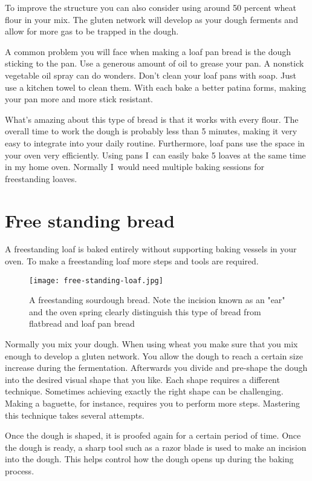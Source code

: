To improve the structure you can also consider using around 50 percent
wheat flour in your mix. The gluten network will develop as your
dough ferments and allow for more gas to be trapped in the dough.

A common problem you will face when making a loaf pan bread is
the dough sticking to the pan. Use a generous amount of oil to grease
your pan. A nonstick vegetable oil spray can do wonders.
Don't clean your loaf pans with soap. Just use a kitchen towel
to clean them. With each bake a better patina forms, making your
pan more and more stick resistant.

What's amazing about this type of bread is that it works
with every flour. The overall time to work the dough is probably
less than 5 minutes, making it very easy to integrate
into your daily routine. Furthermore, loaf pans use the space
in your oven very efficiently. Using pans I~can
easily bake 5 loaves at the same time in my home oven.
Normally I~would need multiple baking sessions for
freestanding loaves.

\section{Free standing bread}

A freestanding loaf is baked entirely without supporting
baking vessels in your oven. To make a freestanding loaf more steps
and tools are required.

\begin{figure}[!htb]
  \texttt{[image: free-standing-loaf.jpg]}
  \centering
  \caption{A freestanding sourdough bread. Note the incision known as an "ear" and the oven spring clearly
  distinguish this type of bread from flatbread and loaf pan bread}
\end{figure}

Normally you mix your dough. When using wheat you make sure
that you mix enough to develop a gluten network.
You allow the dough to reach
a certain size increase during the fermentation. Afterwards you divide and pre-shape
the dough into the desired visual shape that you like.
Each shape requires a different technique. Sometimes achieving
exactly the right shape can be challenging. Making a baguette,
for instance, requires you to perform more steps. Mastering this
technique takes several attempts.

Once the dough is shaped, it is proofed again for a certain
period of time. Once the dough is ready, a sharp tool such
as a razor blade is used to make an incision into the dough.
This helps control how the dough opens up during the baking process.

